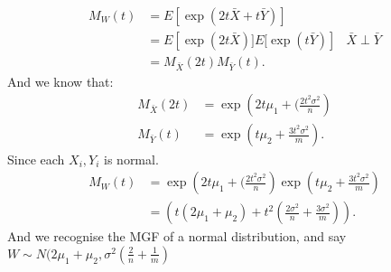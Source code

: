 \documentclass{article}
\begin{document}
\begin{enumerate}
\begin{enumerate}[label= (\alph*)]
            \begin{align*}
                M_W(t)&= E\left[ \exp(2t\bar{X}+t\bar{Y} )\right] \\
                      &= E\left[ \exp(2t\bar{X})]E[\exp(t\bar{Y}) \right]&\bar{X}\perp\bar{Y}\\
                      &= M_{\bar{X}}(2t)M_{\bar{Y}}(t)
            .\end{align*}
            And we know that:
            \begin{align*}
                M_{\bar{X}}(2t)&=\exp\left(2t\mu_1+(\frac{2t^2\sigma^2}{n}\right)  \\
                M_{\bar{Y}}(t)&= \exp\left( t\mu_2 +\frac{3t^2\sigma^2}{m}\right) 
            .\end{align*}
            Since each $X_i,Y_i$ is normal.
            \begin{align*}
                M_W(t)&= \exp\left(2t\mu_1+(\frac{2t^2\sigma^2}{n}\right) \exp\left( t\mu_2 +\frac{3t^2\sigma^2}{m}\right) \\
                &= \left( t(2\mu_1+\mu_2)+t^2\left( \frac{2\sigma^2}{n} + \frac{3\sigma^2}{m} \right)  \right) 
            .\end{align*}
            And we recognise the MGF of a normal distribution, and say
            $W\sim N(2\mu_1+\mu_2,\sigma^2\left( \frac{2}{n}+\frac{1}{m} \right) $


\end{enumerate}
\end{enumerate}
\end{document}
